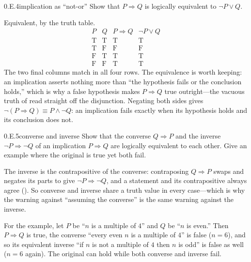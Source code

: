 \documentclass[main.tex]{subfiles}
\begin{document}
\begin{Exercise}{0.E.4}{implication as ``not-or''}
Show that $P\Rightarrow Q$ is logically equivalent to $\neg P\vee Q$.
\end{Exercise}
\begin{Solution}
Equivalent, by the truth table.
\[
\begin{array}{cc|c|c}
P & Q & P\Rightarrow Q & \neg P\vee Q\\\hline
\mathrm T&\mathrm T&\mathrm T&\mathrm T\\
\mathrm T&\mathrm F&\mathrm F&\mathrm F\\
\mathrm F&\mathrm T&\mathrm T&\mathrm T\\
\mathrm F&\mathrm F&\mathrm T&\mathrm T
\end{array}
\]
The two final columns match in all four rows. The equivalence is worth keeping: an implication asserts
nothing more than ``the hypothesis fails or the conclusion holds,'' which is why a false hypothesis
makes $P\Rightarrow Q$ true outright---the vacuous truth of  read straight off the
disjunction. Negating both sides gives $\neg(P\Rightarrow Q)\equiv P\wedge\neg Q$: an implication fails
exactly when its hypothesis holds and its conclusion does not.
\end{Solution}

\begin{Exercise}{0.E.5}{converse and inverse}
Show that the converse $Q\Rightarrow P$ and the inverse $\neg P\Rightarrow\neg Q$ of an implication
$P\Rightarrow Q$ are logically equivalent to each other. Give an example where the original is true yet
both fail.
\end{Exercise}
\begin{Solution}
The inverse is the contrapositive of the converse: contraposing $Q\Rightarrow P$ swaps and negates its
parts to give $\neg P\Rightarrow\neg Q$, and a statement and its contrapositive always agree
(). So converse and inverse share a truth value in every case---which is why the warning
against ``assuming the converse'' is the same warning against the inverse.

For the example, let $P$ be ``$n$ is a multiple of $4$'' and $Q$ be ``$n$ is even.'' Then
$P\Rightarrow Q$ is true, the converse ``every even $n$ is a multiple of $4$'' is false ($n=6$), and so
its equivalent inverse ``if $n$ is not a multiple of $4$ then $n$ is odd'' is false as well ($n=6$
again). The original can hold while both converse and inverse fail.
\end{Solution}
\end{document}
